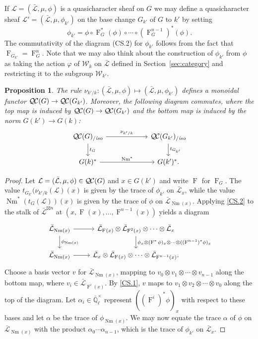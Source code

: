 \documentclass[11pt]{amsart}
\theoremstyle{plain}
\newtheorem{proposition}[theorem]{Proposition}
\theoremstyle{definition}
\theoremstyle{remark}
\newcommand{\EE}{\mathbb{\bar Q}_\ell}
\newcommand{\EEx}{\EE^\times}
\newcommand{\Frob}[1]{\operatorname{F}_{#1}}
\DeclareMathOperator{\Nm}{Nm}
\newcommand{\qcs}[1]{{\mathcal{#1}}}
\newcommand{\gqcs}[1]{{\mathcal{\bar #1}}}
\newcommand{\QC}{{\mathcal{Q\hskip-0.8pt C}}}
\newcommand{\QCiso}[1]{\QC(#1)_{/\textit{iso}}}
\newcommand{\Weil}[1]{\mathcal{W}_{#1}}
\newcommand{\trFrob}[1]{t_{#1}}
\begin{document}
If $\qcs{L} = (\gqcs{L}, \mu, \phi)$ is a quasicharacter sheaf on $G$ we may define
a quasicharacter sheaf $\qcs{L}' = (\gqcs{L}, \mu, \phi_{k'})$ on the base change
$G_{k'}$ of $G$ to $k'$ by setting
\[
\phi_{k'} = \phi \circ \Frob{G}^*(\phi) \circ \cdots \circ (\Frob{G}^{n-1})^*(\phi).
\]
The commutativity of the diagram (CS.2) for $\phi_{k'}$ 
follows from the fact that $\Frob{G_{k'}} = \Frob{G}^n$.
Note that we may also think about the construction of $\phi_{k'}$ from $\phi$
as taking the action $\varphi$ of $\Weil{k}$ on $\gqcs{L}$ 
defined in Section~\ref{sec:category} and restricting it to the subgroup $\Weil{k'}$.

\begin{proposition}\label{prop:basechange}
 The rule $\nu_{k'/k}: (\gqcs{L}, \mu, \phi) \mapsto (\gqcs{L}, \mu, \phi_{k'})$ 
 defines a monoidal functor $\QC(G) \to \QC(G_{k'})$. 
 Moreover, the following diagram commutes, 
 where the top map is induced by $\QC(G) \to \QC(G_{k'})$ 
 and the bottom map is induced by the norm $G(k') \rightarrow G(k)$:
\[
\begin{tikzcd}[column sep=60]
\QCiso{G} \rar{\nu_{k'/k}} \dar{\trFrob{G}} & \QCiso{G_{k'}} \dar{\trFrob{G_{k'}}} \\
G(k)^*  \rar{\Nm^*} & G(k')^*.
\end{tikzcd}
\]
\end{proposition}
\begin{proof}
Let $\qcs{L} = (\gqcs{L}, \mu, \phi) \in \QC(G)$ and $x \in G(k')$ and write $\Frob{}$ for $\Frob{G}$.
The value $t_{G_{k'}}(\nu_{k'/k}(\qcs{L})(x)$ is given by the trace of $\phi_{k'}$ on $\gqcs{L}_x$,
while the value $\Nm^*(t_G(\qcs{L}))(x)$ is given by the trace of $\phi$ on $\gqcs{L}_{\Nm(x)}$.
Applying \ref{CS.2} to the stalk of $\gqcs{L}^{\boxtimes n}$ at $(x, \Frob{}(x), \ldots, \Frob{}^{n-1}(x))$ yields a diagram
\[
\begin{tikzcd}
\gqcs{L}_{\Nm(x)} \rar \dar{\phi_{\Nm(x)}} & \gqcs{L}_{\Frob{}(x)} \otimes \gqcs{L}_{\Frob{}^2(x)} \otimes \cdots \otimes \gqcs{L}_x
\dar{\phi_x \otimes (\Frob{}^*\phi)_x \otimes \cdots \otimes ((\Frob{}^{n-1})^*\phi)_x} \\
\gqcs{L}_{\Nm(x)} \rar & \gqcs{L}_x \otimes \gqcs{L}_{\Frob{}(x)} \otimes \cdots \otimes \gqcs{L}_{\Frob{}^{n-1}(x)}.
\end{tikzcd}
\]
Choose a basis vector $v$ for $\gqcs{L}_{\Nm(x)}$, mapping to $v_0 \otimes v_1 \otimes \cdots \otimes v_{n-1}$
along the bottom map, where $v_i \in \gqcs{L}_{\Frob{}^i(x)}$.  By \ref{CS.1}, $v$ maps to
$v_1 \otimes v_2 \otimes \cdots \otimes v_0$ along the top of the diagram.
Let $\alpha_i \in \EEx$ represent $((\Frob{}^i)^*\phi)_x$ with respect to these bases and let $\alpha$ be
the trace of $\phi_{\Nm(x)}$.  We may now equate the trace $\alpha$ of $\phi$ on $\gqcs{L}_{\Nm(x)}$
with the product $\alpha_0 \cdots \alpha_{n-1}$, which is the trace of $\phi_{k'}$ on $\gqcs{L}_x$.
\end{proof}
\end{document}

